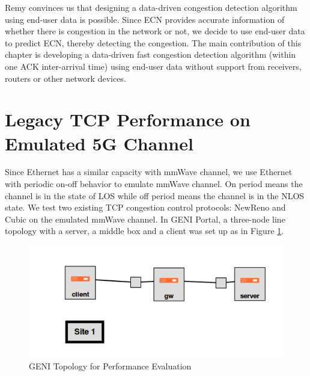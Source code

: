 \par Remy convinces us that designing a data-driven congestion detection algorithm using end-user data is possible. Since ECN provides accurate information of whether there is congestion in the network or not, we decide to use end-user data to predict ECN, thereby detecting the congestion. The main contribution of this chapter is developing a data-driven fast congestion detection algorithm (within one ACK inter-arrival time) using end-user data without support from receivers, routers or other network devices.

\section{Legacy TCP Performance on Emulated 5G Channel}
\label{legacy}
\par Since Ethernet has a similar capacity with mmWave channel, we use Ethernet with periodic on-off behavior to emulate mmWave channel. On period means the channel is in the state of LOS while off period means the channel is in the NLOS state. We test two existing TCP congestion control protocols: NewReno and Cubic on the emulated mmWave channel. In GENI Portal, a three-node line topology with a server, a middle box and a client was set up as in Figure \ref{genitopo}. 
\begin{figure}
\centering
\includegraphics[width=14cm]{topologyGeni.png}
\caption{GENI Topology for Performance Evaluation}
\label{genitopo}
\end{figure}
